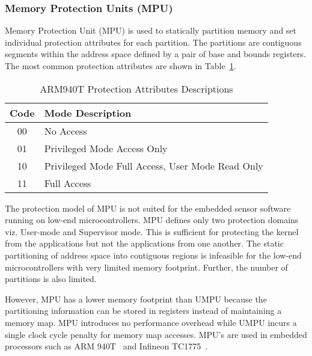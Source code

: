 \subsubsection{Memory Protection Units (MPU)}
\label{sec:mpu}
%
Memory Protection Unit (MPU) is used to statically partition memory
and set individual protection attributes for each partition.
%
The partitions are contiguous segments within the address space
defined by a pair of base and bounds registers.
%
The most common protection attributes are shown in
Table~\ref{tab:armprotattr}.
%
\begin{table}[htdp]
\centering
\small{
\begin{tabular}{|c|l|}
	\hline
	Code & Mode Description\\
	\hline
        00 & No Access \\
        01 & Privileged Mode Access Only \\
        10 & Privileged Mode Full Access, User Mode Read Only \\
        11 & Full Access\\
	\hline
\end{tabular}}
\caption{ARM940T Protection Attributes Descriptions}
\label{tab:armprotattr}
\end{table}
%

The protection model of MPU is not suited for the embedded sensor
software running on low-end microcontrollers.
%
MPU defines only two protection domains viz. User-mode and Supervisor
mode.
%
This is sufficient for protecting the kernel from the applications but
not the applications from one another.
%
The static partitioning of address space into contiguous regions is
infeasible for the low-end microcontrollers with very limited memory
footprint.
%
Further, the number of partitions is also limited.
%

However, MPU has a lower memory footprint than UMPU because the
partitioning information can be stored in registers instead of
maintaining a memory map.
%
MPU introduces no performance overhead while UMPU incurs a single
clock cycle penalty for memory map accesses.
%
MPU's are used in embedded processors such as ARM
940T~\cite{arm940tds} and Infineon TC1775~\cite{inftc1775ds}.
